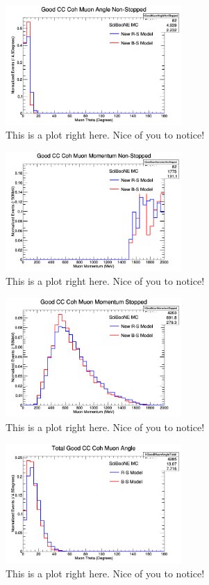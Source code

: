 \documentclass[11pt]{article}
\begin{document}
\begin{figure}[H]
\centering
\includegraphics[width=0.6\textwidth]{ANMCombinedPlotsImages/8-ANMCombinedPlots.png}
\caption{This is a plot right here. Nice of you to notice!}
\end{figure}

\begin{figure}[H]
\centering
\includegraphics[width=0.6\textwidth]{ANMCombinedPlotsImages/9-ANMCombinedPlots.png}
\caption{This is a plot right here. Nice of you to notice!}
\end{figure}

\begin{figure}[H]
\centering
\includegraphics[width=0.6\textwidth]{ANMCombinedPlotsImages/10-ANMCombinedPlots.png}
\caption{This is a plot right here. Nice of you to notice!}
\end{figure}

\begin{figure}[H]
\centering
\includegraphics[width=0.6\textwidth]{ANMCombinedPlotsImages/11-ANMCombinedPlots.png}
\caption{This is a plot right here. Nice of you to notice!}
\end{figure}
\end{document}
